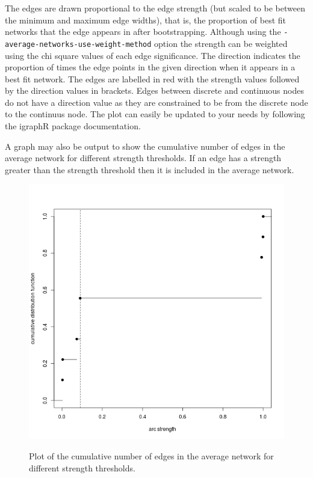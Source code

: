 \documentclass[a4paper,12pt]{article}
\newcommand{\code}[1]{{\footnotesize{{\tt #1}}}}
\begin{document}
The edges are drawn proportional to the edge strength (but scaled to be between the minimum and maximum edge widths), that is, the proportion of best fit networks that the edge appears in after bootstrapping. Although using the \code{-average-networks-use-weight-method} option the strength can be weighted using the chi square values of each edge significance. The direction indicates the proportion of times the edge points in the given direction when it appears in a best fit network. The edges are labelled in red with the strength values followed by the direction values in brackets. Edges between discrete and continuous nodes do not have a direction value as they are constrained to be from the discrete node to the continuus node. The plot can easily be updated to your needs by following the igraphR package documentation. 

A graph may also be output to show the cumulative number of edges in the average network for different strength thresholds. If an edge has a strength greater than the strength threshold then it is included in the average network. 
{\begin{figure}[ht]
{\begin{center}
{\includegraphics[width=400pt]{ave-graph-example-thresholdEst.png}}
\caption{Plot of the cumulative number of edges in the average network for different strength thresholds.}
\label{plot-ave2-fig}
\end{center}}
\end{figure}
}
\end{document}
